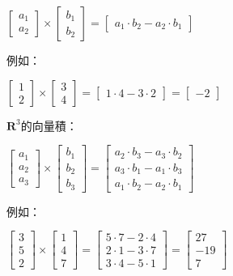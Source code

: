 \documentclass[11pt]{article}
\begin{document}
{\(\begin{bmatrix} a_1 \\ a_2\end{bmatrix} \times \begin{bmatrix} b_1 \\ b_2 \end{bmatrix} = \begin{bmatrix} a_1 \cdot b_2 - a_2 \cdot b_1\end{bmatrix}\)

 例如：

\(\begin{bmatrix} 1 \\ 2 \end{bmatrix} \times \begin{bmatrix} 3 \\4 \end{bmatrix} =\begin{bmatrix} 1 \cdot 4 - 3 \cdot 2 \end{bmatrix}= \begin{bmatrix}-2\end{bmatrix}\)

\(\mathbf{R}^3\)的向量積：

\(\begin{bmatrix} a_1 \\ a_2 \\ a_3\end{bmatrix} \times \begin{bmatrix} b_1 \\ b_2 \\ b_3 \end{bmatrix} = \begin{bmatrix} a_2 \cdot b_3 - a_3 \cdot b_2 \\ a_3 \cdot b_1 - a_1 \cdot b_3 \\ a_1 \cdot b_2 - a_2 \cdot b_1\end{bmatrix}\)

 例如：

\(\begin{bmatrix} 3 \\ 5 \\ 2 \end{bmatrix} \times \begin{bmatrix} 1 \\ 4 \\ 7 \end{bmatrix} =\begin{bmatrix} 5 \cdot 7 - 2 \cdot 4 \\ 2 \cdot 1 - 3 \cdot 7 \\ 3 \cdot 4 - 5 \cdot 1\end{bmatrix}= \begin{bmatrix} 27 \\ -19 \\ 7\end{bmatrix}\)

}
\end{document}
